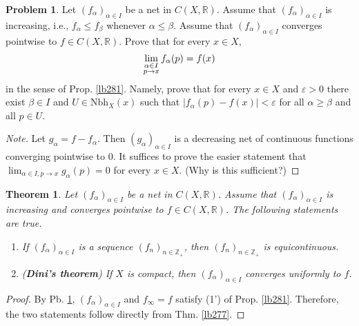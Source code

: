 \documentclass[12pt,b5paper,notitlepage]{article}
\theoremstyle{definition}
\newtheorem{prob}{\color{red}Problem}[section]
\theoremstyle{plain}
\newtheorem{thm}[df]{Theorem}
\newcommand{\Zbb}{\mathbb Z}
\newcommand{\Rbb}{\mathbb R}
\newcommand{\dps}{\displaystyle}
\newcommand{\Nbh}{\mathrm{Nbh}}
\newcommand{\eps}{\varepsilon}
\numberwithin{equation}{section}
\begin{document}
\begin{prob}\label{lb285}
Let $(f_\alpha)_{\alpha\in I}$ be a net in $C(X,\Rbb)$. Assume that $(f_\alpha)_{\alpha\in I}$ is increasing, i.e., $f_\alpha\leq f_\beta$ whenever $\alpha\leq\beta$. Assume that $(f_\alpha)_{\alpha\in I}$ converges pointwise to $f\in C(X,\Rbb)$. Prove that for every $x\in X$,
\begin{align}
\lim_{
\begin{subarray}{c}
\alpha\in I\\
p\rightarrow x
\end{subarray}
}
f_\alpha(p)=f(x)
\end{align}
in the sense of Prop. \ref{lb281}. Namely, prove that for every $x\in X$ and $\eps>0$ there exist $\beta\in I$ and $U\in\Nbh_X(x)$ such that $|f_\alpha(p)-f(x)|<\eps$ for all $\alpha\geq\beta$ and all $p\in U$.
\end{prob}

\begin{proof}[Note]
Let $g_\alpha=f-f_\alpha$. Then $(g_\alpha)_{\alpha\in I}$ is a decreasing net of continuous functions converging pointwise to $0$. It suffices to prove the easier statement that $\dps\lim_{\alpha\in I,p\rightarrow x}g_\alpha(p)=0$ for every $x\in X$. (Why is this sufficient?)
\end{proof}

\begin{thm}\label{lb286}
Let $(f_\alpha)_{\alpha\in I}$ be a net in $C(X,\Rbb)$. Assume that $(f_\alpha)_{\alpha\in I}$ is increasing and converges pointwise to $f\in C(X,\Rbb)$. The following statements are true.
\begin{enumerate}
\item If $(f_\alpha)_{\alpha\in I}$ is a sequence $(f_n)_{n\in\Zbb_+}$, then $(f_n)_{n\in\Zbb_+}$ is equicontinuous.
\item (\textbf{Dini's theorem})  If $X$ is compact, then $(f_\alpha)_{\alpha\in I}$ converges uniformly to $f$.
\end{enumerate}
\end{thm}


\begin{proof}
By Pb. \ref{lb285}, $(f_\alpha)_{\alpha\in I}$ and $f_\infty=f$ satisfy (1') of Prop. \ref{lb281}. Therefore, the two statements follow directly from Thm. \ref{lb277}.
\end{proof}
\end{document}
